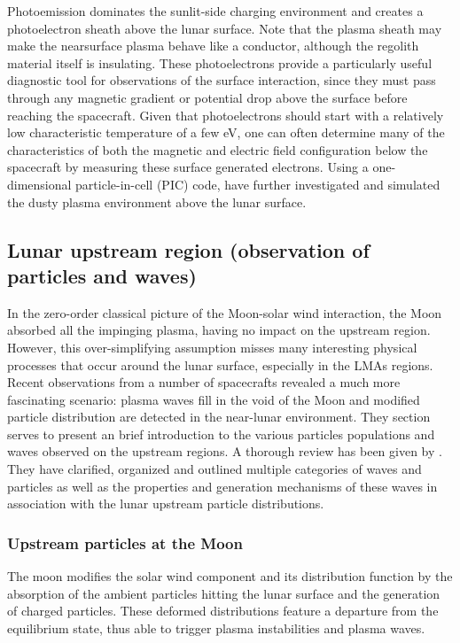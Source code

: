 Photoemission dominates the sunlit-side charging environment and creates a photoelectron sheath above the lunar surface. Note that the plasma sheath may make the nearsurface plasma behave like a conductor, although the regolith material itself is insulating. These photoelectrons provide a particularly useful diagnostic tool for observations of the surface interaction, since they must pass through any magnetic gradient or potential drop above the surface before reaching the spacecraft. Given that photoelectrons should start with a relatively low characteristic temperature of a few eV, one can often determine many of the characteristics of both the magnetic and electric field configuration below the spacecraft by measuring these surface generated electrons. Using a one-dimensional particle-in-cell (PIC) code, \cite{poppeSimulationsPhotoelectronSheath2010} have further investigated and simulated the dusty plasma environment above the lunar surface.


\subsection{Lunar upstream region (observation of particles and waves)}

In the zero-order classical picture of the Moon-solar wind interaction, the Moon absorbed all the impinging plasma, having no impact on the upstream region. However, this over-simplifying assumption misses many interesting physical processes that occur around the lunar surface, especially in the LMAs regions. Recent observations from a number of spacecrafts revealed a much more fascinating scenario: plasma waves fill in the void of the Moon and modified particle distribution are detected in the near-lunar environment. They section serves to present an brief introduction to the various particles populations and waves observed on the upstream regions. A  thorough review has been given by \cite{haradaUpstreamWavesParticles2016}. They have clarified, organized and outlined multiple categories of waves and particles as well as the properties and generation mechanisms of these waves in association with the lunar upstream particle distributions.


\subsubsection{Upstream particles at the Moon}

The moon modifies the solar wind component and its distribution function by the absorption of the ambient particles hitting the lunar surface and the generation of charged particles. These deformed distributions feature a departure from the equilibrium state, thus able to trigger plasma instabilities and plasma waves.

